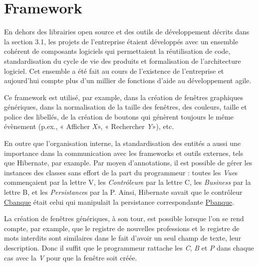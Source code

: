 \pagebreak
\section{Framework}\label{framework}

En dehors des librairies open source et des outils de développement décrits dans la section 3.1, les projets de l'entreprise étaient développés avec un ensemble cohérent de composants logiciels qui permettaient la réutilisation de code, standardisation du cycle de vie des produits et formalisation de l'architecture logiciel. Cet ensemble a été fait au cours de l'existence de l'entreprise et aujourd'hui compte plus d'un millier de fonctions d'aide au développement agile.


Ce framework est utilisé, par example, dans la création de fenêtres graphiques génériques, dans la normalisation de la taille des fenêtres, des couleurs, taille et police des libellés, de la création de boutons qui génèrent toujours le même évènement (p.ex., « Afficher \emph{X}», « Rechercher \emph{Y}»), etc. 

En outre que l'organisation interne, la standardisation des entités a aussi une importance dans la communication avec les frameworks et outils externes, tels que Hibernate, par example. Par moyen d'annotations, il est possible de gérer les instances des classes sans effort de la part du programmeur : toutes les \textit{Vue}s commençaient par la lettre V, les \textit{Contrôleur}s par la lettre C, les \textit{Business} par la lettre B, et les \textit{Persistance}s par la P. Ainsi, Hibernate savait que le contrôleur \underline{Cbanque} était celui qui manipulait la persistance correspondante \underline{Pbanque}.

La création de fenêtres génériques, à son tour, est possible lorsque l'on se rend compte, par example, que le registre de nouvelles professions et le registre de mots interdits sont similaires dans le fait d'avoir un seul champ de texte, leur description. Donc il suffit que le programmeur rattache les \textit{C}, \textit{B} et \textit{P} dans chaque cas avec la \textit{V} pour que la fenêtre soit créée.